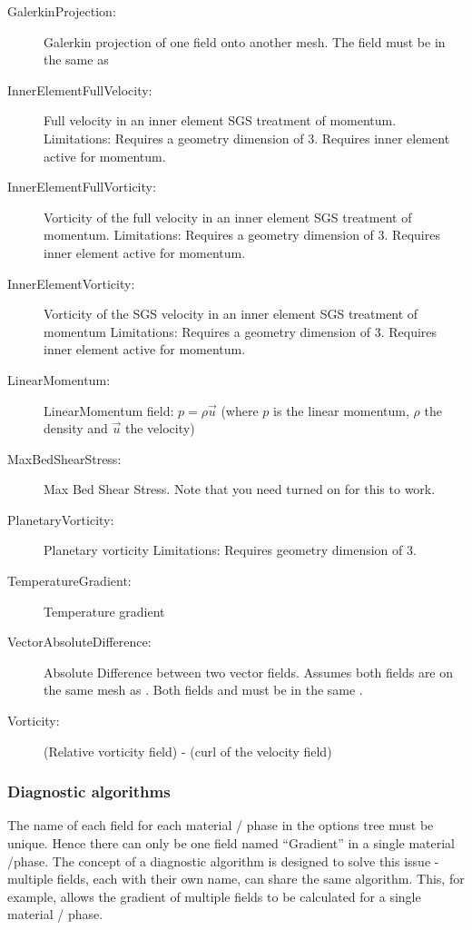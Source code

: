\begin{description}
 \item[GalerkinProjection:]Galerkin projection of one field onto another mesh. The field must be in the same  as 
 \item[InnerElementFullVelocity:]Full velocity in an inner element SGS treatment of momentum.
  Limitations: Requires a geometry dimension of 3. Requires inner element active for momentum.
 \item[InnerElementFullVorticity:]Vorticity of the full velocity in an inner element SGS treatment of momentum.
  Limitations: Requires a geometry dimension of 3. Requires inner element active for momentum.
 \item[InnerElementVorticity:]Vorticity of the SGS velocity in an inner element SGS treatment of momentum
  Limitations: Requires a geometry dimension of 3. Requires inner element active for momentum.
 \item[LinearMomentum:]LinearMomentum field: $p = \rho \vec{u}$ (where $p$ is the linear momentum, $\rho$ the density and $\vec{u}$ the velocity)
 \item[MaxBedShearStress:]Max Bed Shear Stress. Note that you need  turned on for this to work.
 \item[PlanetaryVorticity:]Planetary vorticity
	Limitations: Requires geometry dimension of 3.
 \item[TemperatureGradient:]Temperature gradient
 \item[VectorAbsoluteDifference:]Absolute Difference between two vector fields. Assumes both fields are on the same mesh as . Both fields and  must be in the same .
 \item[Vorticity:](Relative vorticity field) - (curl of the velocity field)
\end{description}


\subsubsection{Diagnostic algorithms}\label{sec:diagnostic_algorithms}

The name of each field for each material / phase  in the options tree must be
unique. Hence there can only be one field named ``Gradient'' in a single
material /phase. The concept of a diagnostic algorithm is designed to solve this
issue - multiple fields, each with their own name, can share the same algorithm.
This, for example, allows the gradient of multiple fields to be calculated for a
single material / phase.

